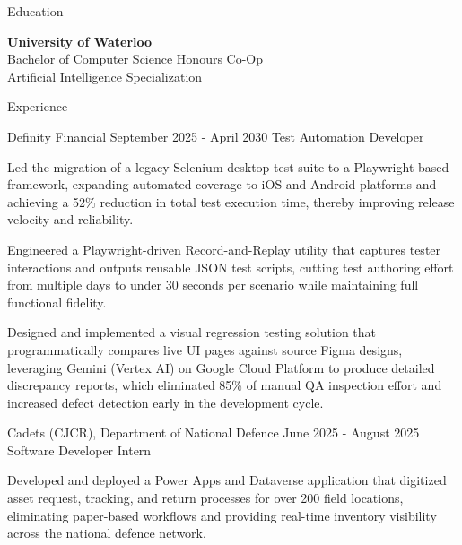 \documentclass{resume}
\begin{document}
\begin{rSection}{Education}

{\fontsize{11}{15}\bf University of Waterloo} \hfill \, \\
{\fontsize{10}{12} Bachelor of Computer Science Honours Co-Op} \hfill {\small \,} \\
{\fontsize{9}{12}\selectfont Artificial Intelligence Specialization}

\end{rSection}

\begin{rSection}{Experience}

\begin{rSubsection}
  {Definity Financial}
  {\small September 2025 - April 2030}
  {Test Automation Developer}
  { }
{\fontsize{10}{12}\selectfont

  \item Led the migration of a legacy Selenium desktop test suite to a Playwright-based framework, expanding automated coverage to iOS and Android platforms and achieving a 52\% reduction in total test execution time, thereby improving release velocity and reliability.

  \item Engineered a Playwright-driven Record-and-Replay utility that captures tester interactions and outputs reusable JSON test scripts, cutting test authoring effort from multiple days to under 30 seconds per scenario while maintaining full functional fidelity.

  \item Designed and implemented a visual regression testing solution that programmatically compares live UI pages against source Figma designs, leveraging Gemini (Vertex AI) on Google Cloud Platform to produce detailed discrepancy reports, which eliminated 85\% of manual QA inspection effort and increased defect detection early in the development cycle.

}
\end{rSubsection}
\vspace{-3mm}

\begin{rSubsection}
  {Cadets (CJCR), Department of National Defence}
  {\small June 2025 - August 2025}
  {Software Developer Intern}
  { }
{\fontsize{10}{12}\selectfont

  \item Developed and deployed a Power Apps and Dataverse application that digitized asset request, tracking, and return processes for over 200 field locations, eliminating paper-based workflows and providing real-time inventory visibility across the national defence network.

}
\end{rSubsection}
\end{rSection}
\end{document}

